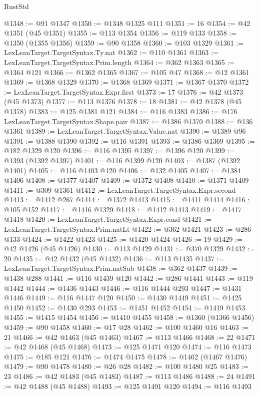 \begin{lexlean}{RustStd}
\begin{coremodule}
@1348 := @91 @1347
@1350 := @1348 @1325 @111
@1351 := 16
@1354 := @42 @1351 (@45 @1351)
@1355 := @113 @1354
@1356 := @119 @133
@1358 := @1350 (@1355 @1356)
@1359 := @90 @1358
@1360 := @103 @1329
@1361 := LexLeanTarget.TargetSyntax.Ty.nat
@1362 := @110 @1361
@1363 := LexLeanTarget.TargetSyntax.Prim.length
@1364 := @362 @1363
@1365 := @1364 @121
@1366 := @1362 @1365
@1367 := @105 @47
@1368 := @12 @1361
@1369 := @1368 @1329
@1370 := @1368 @1369
@1371 := @1367 @1370
@1372 := LexLeanTarget.TargetSyntax.Expr.first
@1373 := 17
@1376 := @42 @1373 (@45 @1373)
@1377 := @113 @1376
@1378 := 18
@1381 := @42 @1378 (@45 @1378)
@1383 := @125 @1381 @121
@1384 := @116 @1383
@1386 := @176 LexLeanTarget.TargetSyntax.Shape.pair
@1387 := @1386 @1370
@1388 := @136 @1361
@1389 := LexLeanTarget.TargetSyntax.Value.nat
@1390 := @1389 @96
@1391 := @1388 @1390
@1392 := @116 @1391
@1393 := @1386 @1369
@1395 := @182 @1329 @120
@1396 := @116 @1395
@1397 := @1396 @120
@1399 := @1393 (@1392 @1397)
@1401 := @116 @1399 @120
@1403 := @1387 (@1392 @1401)
@1405 := @116 @1403 @120
@1406 := @132 @1405
@1407 := @1384 @1406
@1408 := @1377 @1407
@1409 := @1372 @1408
@1410 := @1371 @1409
@1411 := @309 @1361
@1412 := LexLeanTarget.TargetSyntax.Expr.second
@1413 := @1412 @267
@1414 := @1372 @1413
@1415 := @1411 @1414
@1416 := @105 @152
@1417 := @1416 @1329
@1418 := @1412 @1413
@1419 := @1417 @1418
@1420 := LexLeanTarget.TargetSyntax.Expr.cond
@1421 := LexLeanTarget.TargetSyntax.Prim.natLt
@1422 := @362 @1421
@1423 := @286 @133
@1424 := @1422 @1423
@1425 := @1420 @1424
@1426 := 19
@1429 := @42 @1426 (@45 @1426)
@1430 := @113 @1429
@1431 := @370 @1329
@1432 := 20
@1435 := @42 @1432 (@45 @1432)
@1436 := @113 @1435
@1437 := LexLeanTarget.TargetSyntax.Prim.natSub
@1438 := @362 @1437
@1439 := @1438 @288
@1441 := @116 @1439 @120
@1442 := @286 @1441
@1443 := @119 @1442
@1444 := @1436 @1443
@1446 := @116 @1444 @293
@1447 := @1431 @1446
@1449 := @116 @1447 @120
@1450 := @1430 @1449
@1451 := @1425 @1450
@1452 := @1430 @293
@1453 := @1451 @1452
@1454 := @1419 @1453
@1455 := @1415 @1454
@1456 := @1410 @1455
@1458 := @1360 (@1366 @1456)
@1459 := @90 @1458
@1460 := @17 @28
@1462 := @100 @1460 @16
@1463 := 21
@1466 := @42 @1463 (@45 @1463)
@1467 := @113 @1466
@1468 := 22
@1471 := @42 @1468 (@45 @1468)
@1473 := @125 @1471 @120
@1474 := @116 @1473
@1475 := @185 @121
@1476 := @1474 @1475
@1478 := @1462 (@1467 @1476)
@1479 := @90 @1478
@1480 := @26 @28
@1482 := @100 @1480 @25
@1483 := 23
@1486 := @42 @1483 (@45 @1483)
@1487 := @113 @1486
@1488 := 24
@1491 := @42 @1488 (@45 @1488)
@1493 := @125 @1491 @120
@1494 := @116 @1493

\end{coremodule}
\end{lexlean}
